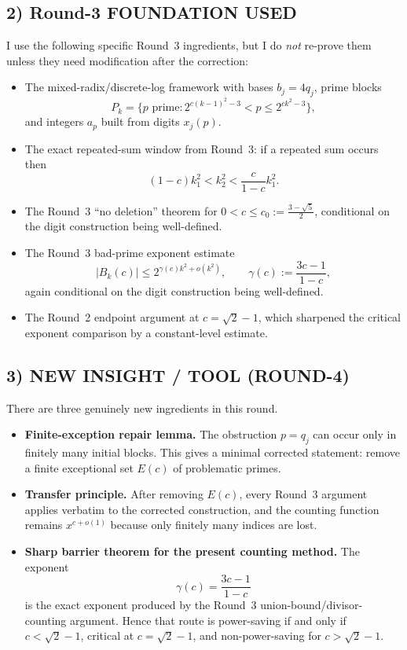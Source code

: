 \subsection*{2) Round-3 FOUNDATION USED}
I use the following specific Round~3 ingredients, but I do \emph{not} re-prove them unless they need modification after the correction:
\begin{itemize}
\item The mixed-radix/discrete-log framework with bases $b_j=4q_j$, prime blocks
\[
P_k=\{p\text{ prime}: 2^{c(k-1)^2-3}<p\le 2^{ck^2-3}\},
\]
and integers $a_p$ built from digits $x_j(p)$.
\item The exact repeated-sum window from Round~3: if a repeated sum occurs then
\[
(1-c)k_1^2<k_2^2<\frac{c}{1-c}k_1^2.
\]
\item The Round~3 ``no deletion'' theorem for $0<c\le c_0:=\frac{3-\sqrt5}{2}$, conditional on the digit construction being well-defined.
\item The Round~3 bad-prime exponent estimate
\[
|B_{k}(c)|\le 2^{\gamma(c)k^2+o(k^2)},
\qquad
\gamma(c):=\frac{3c-1}{1-c},
\]
again conditional on the digit construction being well-defined.
\item The Round~2 endpoint argument at $c=\sqrt2-1$, which sharpened the critical exponent comparison by a constant-level estimate.
\end{itemize}

\subsection*{3) NEW INSIGHT / TOOL (ROUND-4)}
There are three genuinely new ingredients in this round.

\begin{itemize}
\item \textbf{Finite-exception repair lemma.} The obstruction $p=q_j$ can occur only in finitely many initial blocks. This gives a minimal corrected statement: remove a finite exceptional set $E(c)$ of problematic primes.
\item \textbf{Transfer principle.} After removing $E(c)$, every Round~3 argument applies verbatim to the corrected construction, and the counting function remains $x^{c+o(1)}$ because only finitely many indices are lost.
\item \textbf{Sharp barrier theorem for the present counting method.} The exponent
\[
\gamma(c)=\frac{3c-1}{1-c}
\]
is the exact exponent produced by the Round~3 union-bound/divisor-counting argument. Hence that route is power-saving if and only if $c<\sqrt2-1$, critical at $c=\sqrt2-1$, and non-power-saving for $c>\sqrt2-1$.
\end{itemize}

